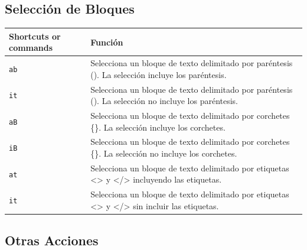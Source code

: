 \documentclass[
  doc,
  floatsintext,
  longtable,
  a4paper,
  nolmodern,
  notxfonts,
  notimes,
  12pt,
  colorlinks=true,linkcolor=blue,citecolor=blue,urlcolor=blue]{apa7}
\newcounter{none} %
\begin{document}
\subsection{Selección de Bloques}\label{selecciuxf3n-de-bloques}

{\def\LTcaptype{none} %
\begin{longtable}[]{@{}
  >{\raggedright\arraybackslash}p{}
  >{\raggedright\arraybackslash}p{}@{}}
\toprule\noalign{}
\begin{minipage}[b]{\linewidth}\raggedright
Shortcuts or commands
\end{minipage} & \begin{minipage}[b]{\linewidth}\raggedright
Función
\end{minipage} \\
\midrule\noalign{}
\endhead
\bottomrule\noalign{}
\endlastfoot
\texttt{ab} & Selecciona un bloque de texto delimitado por paréntesis
(). La selección incluye los paréntesis. \\
\texttt{it} & Selecciona un bloque de texto delimitado por paréntesis
(). La selección no incluye los paréntesis. \\
\texttt{aB} & Selecciona un bloque de texto delimitado por corchetes
\{\}. La selección incluye los corchetes. \\
\texttt{iB} & Selecciona un bloque de texto delimitado por corchetes
\{\}. La selección no incluye los corchetes. \\
\texttt{at} & Selecciona un bloque de texto delimitado por etiquetas
\textless\textgreater{} y \textless/\textgreater{} incluyendo las
etiquetas. \\
\texttt{it} & Selecciona un bloque de texto delimitado por etiquetas
\textless\textgreater{} y \textless/\textgreater{} sin incluir las
etiquetas. \\
\end{longtable}
}

\subsection{Otras Acciones}\label{otras-acciones}
\end{document}
